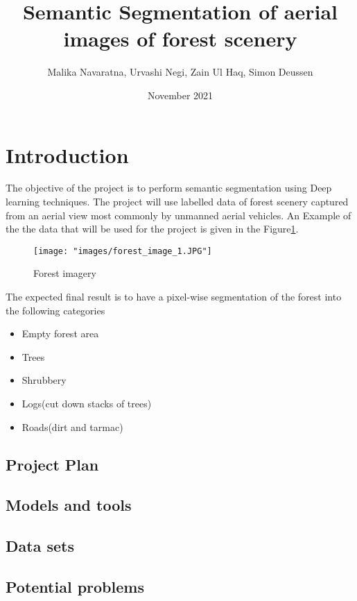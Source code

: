 \documentclass[rnd]{mas_proposal}
\title{Semantic Segmentation of aerial images of forest scenery}
\author{Malika Navaratna, Urvashi Negi, Zain Ul Haq, Simon Deussen}
\date{November 2021}
\begin{document}
\maketitle

\pagestyle{plain}

\section{Introduction}

    The objective of the project is to perform semantic segmentation using Deep learning techniques. The project will use
    labelled data of forest scenery captured from an aerial view most commonly by unmanned aerial vehicles. An Example of the
    the data that will be used for the project is given in the Figure\ref{fig:Example image}. 
    \begin{figure}[h!]
        \centering
        \texttt{[image: "images/forest\_image\_1.JPG"]}
        \caption{Forest imagery}
        \label{fig:Example image}
        \end{figure} 
    \linebreak
    The expected final result is to have a pixel-wise segmentation of the forest into the following categories    
        \begin{itemize}
            \item Empty forest area
            \item Trees
            \item Shrubbery
            \item Logs(cut down stacks of trees)
            \item Roads(dirt and tarmac)
        \end{itemize}

\subsection{Project Plan}

    \subsection{Models and tools}

    \subsection{Data sets}

    \subsection{Potential problems}
    
\end{document}
